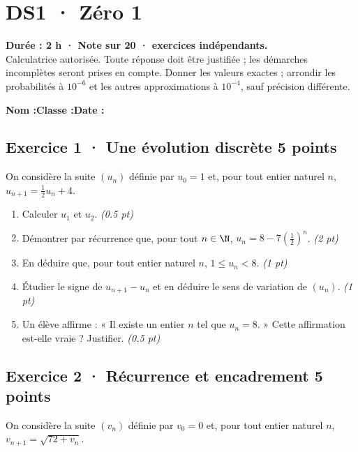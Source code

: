 \mxnewpage{}\label{sujet:1-1}

\section*{DS1 · Zéro 1}


\textbf{Durée : 2 h · Note sur 20 ·  exercices indépendants.}\\Calculatrice autorisée. Toute réponse doit être justifiée ; les démarches incomplètes seront prises en compte. Donner les valeurs exactes ; arrondir les probabilités à $10^{-6}$ et les autres approximations à $10^{-4}$, sauf précision différente.

\smallskip\textbf{Nom :}\enspace\dotfill\quad\textbf{Classe :}\enspace\dotfill\quad\textbf{Date :}\enspace\dotfill

\subsection*{Exercice 1 · Une évolution discrète \hfill 5 points}On considère la suite $(u_n)$ définie par $u_0=1$ et, pour tout entier naturel $n$, $u_{n+1}=\frac{1}{2}u_n+4$.

\begin{enumerate}

\item Calculer $u_1$ et $u_2$. \hfill\textit{(\num{0,5} pt)}

\item Démontrer par récurrence que, pour tout $n\in\N$, $u_n=8-7\left(\frac{1}{2}\right)^n$. \hfill\textit{(2 pt)}

\item En déduire que, pour tout entier naturel $n$, $1\le u_n<8$. \hfill\textit{(1 pt)}

\item Étudier le signe de $u_{n+1}-u_n$ et en déduire le sens de variation de $(u_n)$. \hfill\textit{(1 pt)}

\item Un élève affirme : « Il existe un entier $n$ tel que $u_n=8$. » Cette affirmation est-elle vraie ? Justifier. \hfill\textit{(\num{0,5} pt)}

\end{enumerate}

\subsection*{Exercice 2 · Récurrence et encadrement \hfill 5 points}On considère la suite $(v_n)$ définie par $v_0=0$ et, pour tout entier naturel $n$, $v_{n+1}=\sqrt{72+v_n}$.

